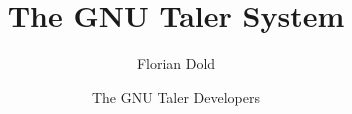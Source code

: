 \documentclass[10pt]{book}
\author{Florian Dold \and The GNU Taler Developers}
\title{The GNU Taler System}
\begin{document}
\newcommand{\astfootnote}[1]{
\let\oldthefootnote=\thefootnote%
\setcounter{footnote}{0}%
\renewcommand{\thefootnote}{\fnsymbol{footnote}}%
\footnote{#1}%
\let\thefootnote=\oldthefootnote%
}

\maketitle
\frontmatter


\tableofcontents
\listoffigures
\mainmatter








\printbibliography[heading=bibintoc]
\end{document}
